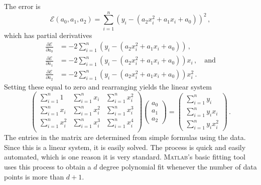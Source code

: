 The error is 
\[
\mathcal{E}(a_0,a_1,a_2) =\sum_{i=1}^n \left( y_i - (a_2 x_i^2 + a_1 x_i +a_0) \right)^2
\,,
\]
which has partial derivatives
\begin{align*}
  \frac{ \partial \mathcal{E}}{\partial a_0} 
  & = -2 \sum_{i=1}^n \left( y_i - (a_2 x_i^2 + a_1 x_i +a_0) \right)\,,\\
  \frac{ \partial \mathcal{E}}{\partial a_1} 
  & = -2 \sum_{i=1}^n \left( y_i - (a_2 x_i^2 + a_1 x_i +a_0) \right)x_i\,,\quad\text{and}\\
  \frac{ \partial \mathcal{E}}{\partial a_2}                                              
  & = -2 \sum_{i=1}^n \left( y_i - (a_2 x_i^2 + a_1 x_i +a_0) \right)x_i^2
    \,.
\end{align*}
Setting these equal to zero and rearranging yields the linear system
\[
\begin{pmatrix}
   \displaystyle\sum_{i=1}^n 1 &  \displaystyle\sum_{i=1}^n x_i &
   \displaystyle\sum_{i=1}^n x_i^2\\
   \displaystyle\sum_{i=1}^n x_i &  \displaystyle\sum_{i=1}^n x_i^2&
   \displaystyle\sum_{i=1}^n x_i^3\\
   \displaystyle\sum_{i=1}^n x_i^2&  \displaystyle\sum_{i=1}^n x_i^3&
   \displaystyle\sum_{i=1}^n x_i^4\\
\end{pmatrix}
\begin{pmatrix}
  a_0 \\ a_1 \\ a_2
\end{pmatrix}
=
\begin{pmatrix}
  \displaystyle\sum_{i=1}^n y_i \\ \displaystyle\sum_{i=1}^n y_ix_i \\ \displaystyle\sum_{i=1}^n y_i x_i^2
\end{pmatrix}
\,.
\]
The entries in the matrix are determined from simple formulas using
the data. Since this is a linear system, it is easily solved.
The process is quick and easily automated, which is one
reason it is very standard.
\textsc{Matlab}'s  basic fitting tool uses this process to obtain a
$d$ degree polynomial fit whenever the number of data points is more than
$d+1$.


